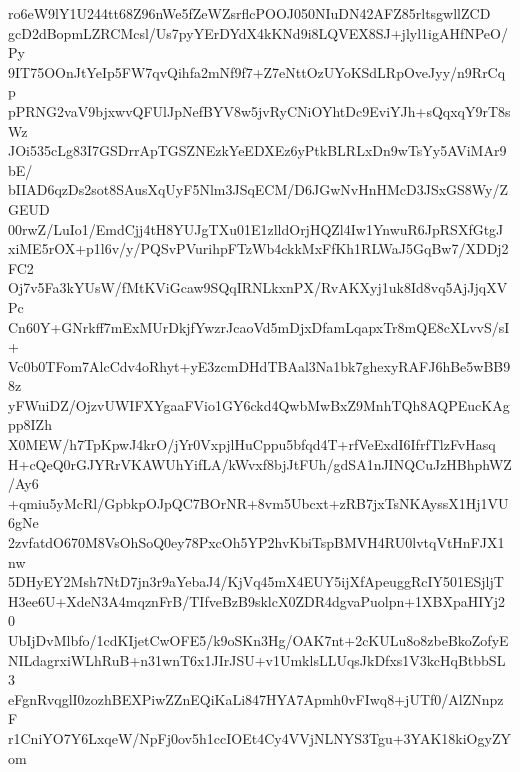 ro6eW9lY1U244tt68Z96nWe5fZeWZsrflcPOOJ050NIuDN42AFZ85rltsgwllZCD
gcD2dBopmLZRCMcsl/Us7pyYErDYdX4kKNd9i8LQVEX8SJ+jlyl1igAHfNPeO/Py
9IT75OOnJtYeIp5FW7qvQihfa2mNf9f7+Z7eNttOzUYoKSdLRpOveJyy/n9RrCqp
pPRNG2vaV9bjxwvQFUlJpNefBYV8w5jvRyCNiOYhtDc9EviYJh+sQqxqY9rT8sWz
JOi535cLg83I7GSDrrApTGSZNEzkYeEDXEz6yPtkBLRLxDn9wTsYy5AViMAr9bE/
bIIAD6qzDs2sot8SAusXqUyF5Nlm3JSqECM/D6JGwNvHnHMcD3JSxGS8Wy/ZGEUD
00rwZ/LuIo1/EmdCjj4tH8YUJgTXu01E1zlldOrjHQZl4Iw1YnwuR6JpRSXfGtgJ
xiME5rOX+p1l6v/y/PQSvPVurihpFTzWb4ckkMxFfKh1RLWaJ5GqBw7/XDDj2FC2
Oj7v5Fa3kYUsW/fMtKViGcaw9SQqIRNLkxnPX/RvAKXyj1uk8Id8vq5AjJjqXVPc
Cn60Y+GNrkff7mExMUrDkjfYwzrJcaoVd5mDjxDfamLqapxTr8mQE8cXLvvS/sI+
Vc0b0TFom7AlcCdv4oRhyt+yE3zcmDHdTBAal3Na1bk7ghexyRAFJ6hBe5wBB98z
yFWuiDZ/OjzvUWIFXYgaaFVio1GY6ckd4QwbMwBxZ9MnhTQh8AQPEucKAgpp8IZh
X0MEW/h7TpKpwJ4krO/jYr0VxpjlHuCppu5bfqd4T+rfVeExdI6IfrfTlzFvHasq
H+cQeQ0rGJYRrVKAWUhYifLA/kWvxf8bjJtFUh/gdSA1nJINQCuJzHBhphWZ/Ay6
+qmiu5yMcRl/GpbkpOJpQC7BOrNR+8vm5Ubcxt+zRB7jxTsNKAyssX1Hj1VU6gNe
2zvfatdO670M8VsOhSoQ0ey78PxcOh5YP2hvKbiTspBMVH4RU0lvtqVtHnFJX1nw
5DHyEY2Msh7NtD7jn3r9aYebaJ4/KjVq45mX4EUY5ijXfApeuggRcIY501ESjljT
H3ee6U+XdeN3A4mqznFrB/TIfveBzB9sklcX0ZDR4dgvaPuolpn+1XBXpaHIYj20
UbIjDvMlbfo/1cdKIjetCwOFE5/k9oSKn3Hg/OAK7nt+2cKULu8o8zbeBkoZofyE
NILdagrxiWLhRuB+n31wnT6x1JIrJSU+v1UmklsLLUqsJkDfxs1V3kcHqBtbbSL3
eFgnRvqglI0zozhBEXPiwZZnEQiKaLi847HYA7Apmh0vFIwq8+jUTf0/AlZNnpzF
r1CniYO7Y6LxqeW/NpFj0ov5h1ccIOEt4Cy4VVjNLNYS3Tgu+3YAK18kiOgyZYom
